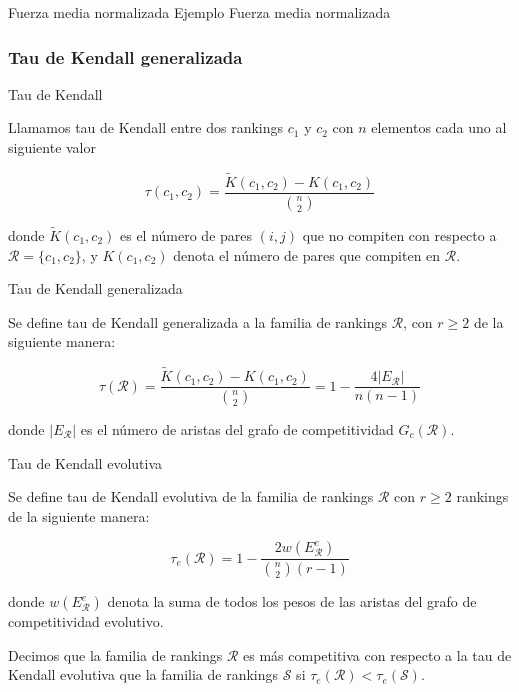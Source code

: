 \documentclass[11pt]{beamer}
\begin{document}
	\begin{frame}{Fuerza media normalizada}
	Ejemplo	Fuerza media normalizada
	\end{frame}
	
	\subsubsection{Tau de Kendall generalizada}
	
	\begin{frame}{Tau de Kendall}
		\begin{defi}
			Llamamos tau de Kendall entre dos rankings $c_1$ y $c_2$ con $n$ elementos cada uno al siguiente valor
			
			\begin{equation}
			\tau(c_1, c_2) = \dfrac{\tilde{K}(c_1, c_2) - K(c_1, c_2)}{\binom{n}{2}}
			\end{equation} 
			
			donde $\tilde{K}(c_1, c_2)$ es el número de pares $(i,j)$ que no compiten con respecto a $\mathcal{R} = \{c_1, c_2\}$, y $K(c_1, c_2)$ denota el número de pares que compiten en $\mathcal{R}$.
		\end{defi}
	\end{frame}
	
	\begin{frame}{Tau de Kendall generalizada}
		\begin{defi}
			Se define tau de Kendall generalizada a la familia de rankings $\mathcal{R}$, con $r \geq 2$ de la siguiente manera:
			
			\begin{equation}
			\tau(\mathcal{R}) = \dfrac{\tilde{K}(c_1, c_2) - K(c_1, c_2)}{\binom{n}{2}} = 1 - \dfrac{4 |E_\mathcal{R}|}{n(n-1)}
			\end{equation}
			
			donde $|E_\mathcal{R}|$ es el número de aristas del grafo de competitividad $G_c(\mathcal{R})$.
		\end{defi}
		
	\end{frame}
	
	\begin{frame}{Tau de Kendall evolutiva}
		\begin{defi}
			Se define tau de Kendall evolutiva de la familia de rankings $\mathcal{R}$ con $r \geq 2$ rankings de la siguiente manera:
			
			\begin{equation}
			\tau_e(\mathcal{R}) = 1 - \dfrac{2 w(E_\mathcal{R}^e)}{\binom{n}{2}(r-1)}
			\end{equation} 
			
			donde $w(E_\mathcal{R}^e)$ denota la suma de todos los pesos de las aristas del grafo de competitividad evolutivo.
		\end{defi}
		
		\begin{defi}
			Decimos que la familia de rankings $\mathcal{R}$ es más competitiva con respecto a la tau de Kendall evolutiva que la familia de rankings $\mathcal{S}$ si $\tau_e(\mathcal{R}) < \tau_e(\mathcal{S})$.
		\end{defi}
	\end{frame}
	
\end{document}
